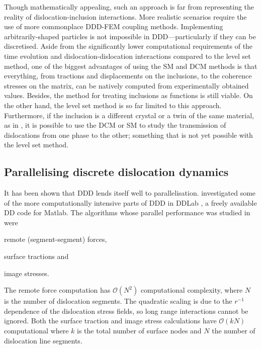 Though mathematically appealing, such an approach is far from representing the reality of dislocation-inclusion interactions. More realistic scenarios require the use of more commonplace DDD-FEM coupling methods. Implementing arbitrarily-shaped particles is not impossible in DDD---particularly if they can be discretised. Aside from the significantly lower computational requirements of the time evolution and dislocation-dislocation interactions compared to the level set method, one of the biggest advantages of using the SM and DCM methods is that everything, from tractions and displacements on the inclusions, to the coherence stresses on the matrix, can be natively computed from experimentally obtained values. Besides, the method for treating inclusions as functions is still viable. On the other hand, the level set method is so far limited to this approach. Furthermore, if the inclusion is a different crystal or a twin of the same material, as in \cite{twinning}, it is possible to use the DCM or SM to study the transmission of dislocations from one phase to the other; something that is not yet possible with the level set method.

\subsection{Parallelising discrete dislocation dynamics}
\label{ss:parallel_ddd}

It has been shown that DDD lends itself well to parallelisation.  investigated some of the more computationally intensive parts of DDD in DDLab \cite{ddlab}, a freely available DD code for Matlab. The algorithms whose parallel performance was studied in \cite{gpu_ddd} were
\begin{inparaenum}
    \item remote (segment-segment) forces,
    \item surface tractions and
    \item image stresses.
\end{inparaenum}
The remote force computation has $ \mathcal{O}(N^{2}) $ computational complexity, where $ N $ is the number of dislocation segments. The quadratic scaling is due to the $ r^{-1} $ dependence of the dislocation stress fields, so long range interactions cannot be ignored. Both the surface traction and image stress calculations have $ \mathcal{O}(k N) $ computational where $ k $ is the total number of surface nodes and $ N $ the number of dislocation line segments.

